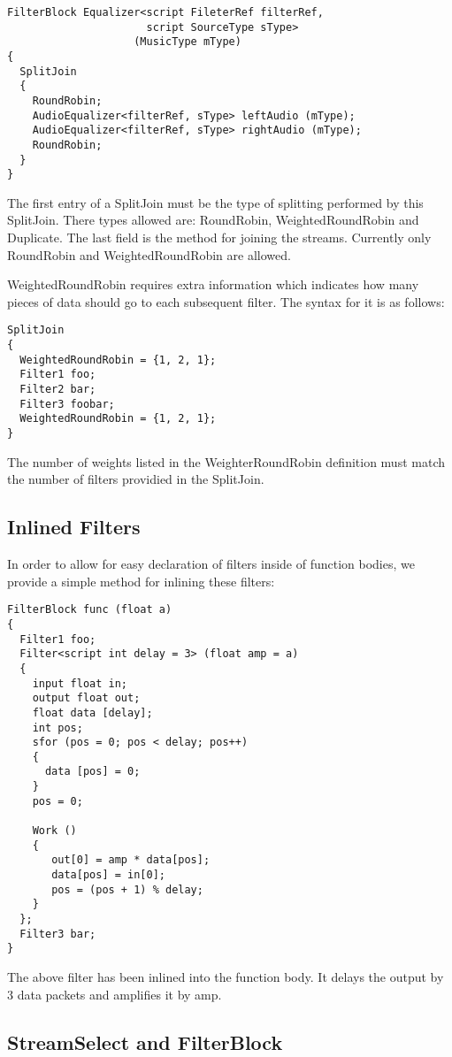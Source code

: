 \documentclass[twocolumn, draft]{article}
\begin{document}
\begin{verbatim}
FilterBlock Equalizer<script FileterRef filterRef,
                      script SourceType sType>
                    (MusicType mType)
{
  SplitJoin
  {
    RoundRobin;
    AudioEqualizer<filterRef, sType> leftAudio (mType);
    AudioEqualizer<filterRef, sType> rightAudio (mType);
    RoundRobin;
  }
}
\end{verbatim}

The first entry of a SplitJoin must be the type of splitting performed
by this SplitJoin.  There types allowed are:  RoundRobin, WeightedRoundRobin
and Duplicate.  The last field is the method for joining the streams.  
Currently only RoundRobin and WeightedRoundRobin are allowed.

WeightedRoundRobin requires extra information which indicates how many
pieces of data should go to each subsequent filter.  The syntax for it
is as follows:

\begin{verbatim}
SplitJoin
{
  WeightedRoundRobin = {1, 2, 1};
  Filter1 foo;
  Filter2 bar;
  Filter3 foobar;
  WeightedRoundRobin = {1, 2, 1};
}
\end{verbatim}

The number of weights listed in the WeighterRoundRobin definition must
match the number of filters providied in the SplitJoin.

\subsection{Inlined Filters}

In order to allow for easy declaration of filters inside of function
bodies, we provide a simple method for inlining these filters:

\begin{verbatim}
FilterBlock func (float a)
{
  Filter1 foo;
  Filter<script int delay = 3> (float amp = a)
  {
    input float in;
    output float out;
    float data [delay];
    int pos;
    sfor (pos = 0; pos < delay; pos++)
    {
      data [pos] = 0;
    }
    pos = 0;

    Work ()
    {
       out[0] = amp * data[pos];
       data[pos] = in[0];
       pos = (pos + 1) % delay;
    }
  };
  Filter3 bar;
}
\end{verbatim}

The above filter has been inlined into the function body.  It delays
the output by 3 data packets and amplifies it by amp.

\subsection{StreamSelect and FilterBlock}
\end{document}
